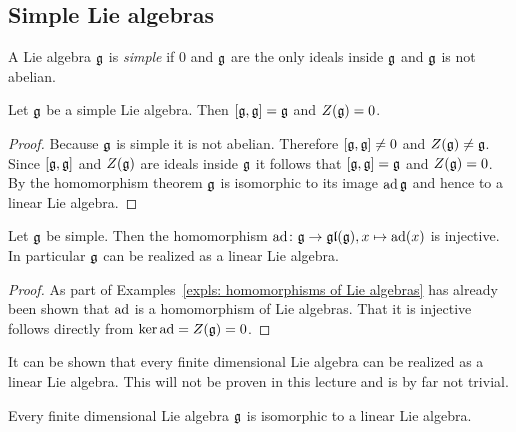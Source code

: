 \subsection{Simple Lie algebras}


\begin{defi}
 A Lie algebra $\mathfrak{g}$ is \emph{simple} if $0$ and $\mathfrak{g}$ are the only ideals inside $\mathfrak{g}$ and $\mathfrak{g}$ is not abelian.
\end{defi}


\begin{lem}
 Let $\mathfrak{g}$ be a simple Lie algebra. Then $[\mathfrak{g},\mathfrak{g}] = \mathfrak{g}$ and $Z(\mathfrak{g})=0$.
\end{lem}
\begin{proof}
 Because $\mathfrak{g}$ is simple it is not abelian. Therefore $[\mathfrak{g},\mathfrak{g}] \neq 0$ and $Z(\mathfrak{g}) \neq \mathfrak{g}$. Since $[\mathfrak{g},\mathfrak{g}]$ and $Z(\mathfrak{g})$ are ideals inside $\mathfrak{g}$ it follows that $[\mathfrak{g},\mathfrak{g}] = \mathfrak{g}$ and $Z(\mathfrak{g}) = 0$. By the homomorphism theorem $\mathfrak{g}$ is isomorphic to its image $\operatorname{ad} \mathfrak{g}$ and hence to a linear Lie algebra.
\end{proof}


\begin{cor}
 Let $\mathfrak{g}$ be simple. Then the homomorphism $\operatorname{ad} \colon \mathfrak{g} \to \mathfrak{gl}(\mathfrak{g}), x \mapsto \operatorname{ad}(x)$ is injective. In particular $\mathfrak{g}$ can be realized as a linear Lie algebra.
\end{cor}
\begin{proof}
 As part of Examples~\ref{expls: homomorphisms of Lie algebras} has already been shown that $\operatorname{ad}$ is a homomorphism of Lie algebras. That it is injective follows directly from $\ker \operatorname{ad} = Z(\mathfrak{g}) = 0$.
\end{proof}


It can be shown that every finite dimensional Lie algebra can be realized as a linear Lie algebra. This will not be proven in this lecture and is by far not trivial.


\begin{thrm}[Ado]
 Every finite dimensional Lie algebra $\mathfrak{g}$ is isomorphic to a linear Lie algebra.
\end{thrm}



